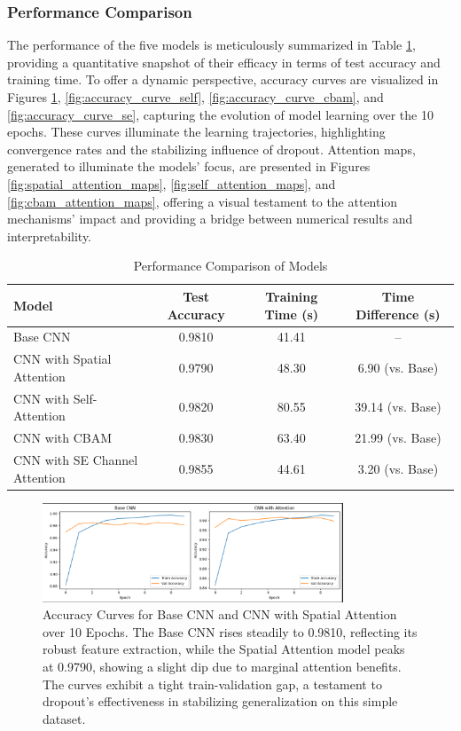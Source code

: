\documentclass[12pt]{article}
\begin{document}
\subsubsection{Performance Comparison}
The performance of the five models is meticulously summarized in Table \ref{tab:performance}, providing a quantitative snapshot of their efficacy in terms of test accuracy and training time. To offer a dynamic perspective, accuracy curves are visualized in Figures \ref{fig:accuracy_curves_base_spatial}, \ref{fig:accuracy_curve_self}, \ref{fig:accuracy_curve_cbam}, and \ref{fig:accuracy_curve_se}, capturing the evolution of model learning over the 10 epochs. These curves illuminate the learning trajectories, highlighting convergence rates and the stabilizing influence of dropout. Attention maps, generated to illuminate the models' focus, are presented in Figures \ref{fig:spatial_attention_maps}, \ref{fig:self_attention_maps}, and \ref{fig:cbam_attention_maps}, offering a visual testament to the attention mechanisms' impact and providing a bridge between numerical results and interpretability.

\begin{table}[H]
    \centering
    \caption{Performance Comparison of Models}
    \label{tab:performance}
    \begin{tabular}{l c c c}
        \toprule
        \textbf{Model} & \textbf{Test Accuracy} & \textbf{Training Time (s)} & \textbf{ Time Difference (s)} \\
        \midrule
        Base CNN & 0.9810 & 41.41 & -- \\
        CNN with Spatial Attention & 0.9790 & 48.30 & 6.90 (vs. Base) \\
        CNN with Self-Attention & 0.9820 & 80.55 & 39.14 (vs. Base) \\
        CNN with CBAM & 0.9830 & 63.40 & 21.99 (vs. Base) \\
        CNN with SE Channel Attention & 0.9855 & 44.61 & 3.20 (vs. Base) \\
        \bottomrule
    \end{tabular}
\end{table}

\begin{figure}[H]
    \centering
    \includegraphics[width=0.8\textwidth]{accuracy_curves_base_spatial.png}
    \caption{Accuracy Curves for Base CNN and CNN with Spatial Attention over 10 Epochs. The Base CNN rises steadily to 0.9810, reflecting its robust feature extraction, while the Spatial Attention model peaks at 0.9790, showing a slight dip due to marginal attention benefits. The curves exhibit a tight train-validation gap, a testament to dropout's effectiveness in stabilizing generalization on this simple dataset.}
    \label{fig:accuracy_curves_base_spatial}
\end{figure}
\end{document}
